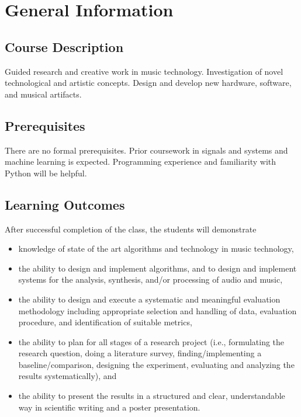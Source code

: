 \documentclass[letterpaper,oneside,10pt]{scrartcl}
\begin{document}
\section{General Information}        
    \subsection{Course Description}
        Guided research and creative work in music technology. Investigation of novel technological and artistic concepts. Design and develop new hardware, software, and musical artifacts.
        
    \subsection{Prerequisites}
        There are no formal prerequisites. Prior coursework in signals and systems and machine learning is expected. Programming experience and familiarity with Python will be helpful.

    \subsection{Learning Outcomes}
        After successful completion of the class, the students will demonstrate 
        \begin{itemize}
            \item   knowledge of state of the art algorithms and technology in music technology,
            \item   the ability to design and implement algorithms, and to design and implement systems for the analysis, synthesis, and/or processing of audio and music,
            \item   the ability to design and execute a systematic and meaningful evaluation methodology including appropriate selection and handling of data, evaluation procedure, and identification of suitable metrics,
            \item   the ability to plan for all stages of a research project (i.e., formulating the research question, doing a literature survey, finding/implementing a baseline/comparison, designing the experiment, evaluating and analyzing the results systematically), and 
            \item   the ability to present the results in a structured and clear, understandable way in scientific writing and a poster presentation.
        \end{itemize}
        
\end{document}
